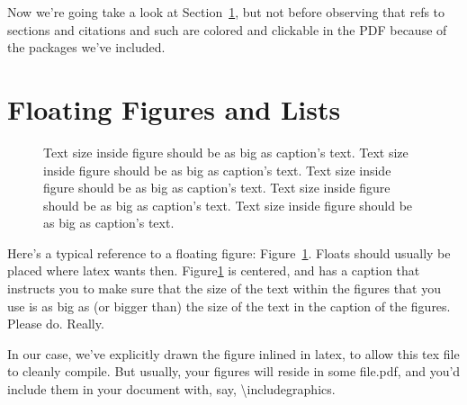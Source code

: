 Now we're going take a look at Section~\ref{sec:figs}, but not before observing that refs to sections and citations and such are colored and clickable in the PDF because of the packages we've included.\par

\section{Floating Figures and Lists}
\label{sec:figs}

\begin{figure}
    \begin{center}
    \end{center}
    \caption{ Text size inside figure should be as big as caption's text. Text size inside figure should be as big as caption's text. Text size inside figure should be as big as caption's text. Text size inside figure should be as big as caption's text. Text size inside figure should be as big as caption's text. }
    \label{fig:vectors}
\end{figure}

Here's a typical reference to a floating figure: Figure~\ref{fig:vectors}. Floats should usually be placed where latex wants then. Figure\ref{fig:vectors} is centered, and has a caption that instructs you to make sure that the size of the text within the figures that you use is as big as (or bigger than) the size of the text in the caption of the figures. Please do. Really.\par

In our case, we've explicitly drawn the figure inlined in latex, to allow this tex file to cleanly compile. But usually, your figures will reside in some file.pdf, and you'd include them in your document with, say, \textbackslash{}includegraphics.\par


